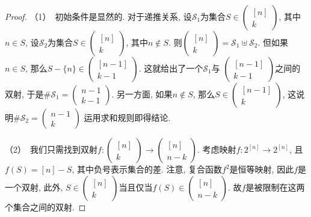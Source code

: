 \documentclass{ctexbook}
\begin{document}
    \begin{proof}
    	（1）\ 初始条件是显然的. 对于递推关系, 设$\mathcal{S}_{1}$为集合$S \in\left(\begin{array}{c}{[n]} \\ k\end{array}\right)$, 其中$n \in S$,
    	设$\mathcal{S}_{2}$为集合$S \in\left(\begin{array}{c}{[n]} \\ k\end{array}\right)$, 其中$n \notin S$.
    	则$\left(\begin{array}{c}{[n]} \\ k\end{array}\right)=\mathcal{S}_{1} \uplus \mathcal{S}_{2}$. 但如果$n \in S$,
    	那么$S-\{n\} \in\left(\begin{array}{c}{[n-1]} \\ k-1\end{array}\right)$. 这就给出了一个$\mathcal{S}_{1}$与
    	$\left(\begin{array}{c}{[n-1]} \\ k-1\end{array}\right)$之间的双射, 于是$\# \mathcal{S}_{1}=\left(\begin{array}{c}n-1 \\ k-1\end{array}\right)$.
    	另一方面, 如果$n \notin S$, 那么$S \in\left(\begin{array}{c}{[n-1]} \\ k\end{array}\right)$, 这说明$\# \mathcal{S}_{2}=\left(\begin{array}{c}n-1 \\ k\end{array}\right)$
    	运用求和规则即得结论.

    	（2）\ 我们只需找到双射$f:\left(\begin{array}{c}{[n]} \\ k\end{array}\right) \rightarrow\left(\begin{array}{c}{[n]} \\ n-k\end{array}\right)$.
    	考虑映射$f:   2^{[n]} \rightarrow 2^{[n]}$, 且$f(S)=[n]-S$, 其中负号表示集合的差. 注意, 复合函数$f^{2}$是恒等映射, 因此$f$是一个双射,
    	此外, $S \in\left(\begin{array}{c}{[n]} \\ k\end{array}\right)$当且仅当$f(S) \in\left(\begin{array}{c}{[n]} \\ n-k\end{array}\right)$.
    	故$f$是被限制在这两个集合之间的双射.


\end{proof}
\end{document}
